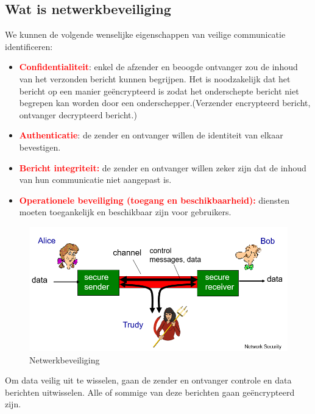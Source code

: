 \subsection{Wat is netwerkbeveiliging}
We kunnen de volgende wenselijke eigenschappen van veilige communicatie identificeren:
\begin{itemize}
    \item \textcolor{red}{\textbf{Confidentialiteit}}: enkel de afzender en beoogde ontvanger zou de inhoud van het verzonden bericht kunnen begrijpen. Het is noodzakelijk dat het bericht op een manier geëncrypteerd is zodat het onderschepte bericht niet begrepen kan worden door een onderschepper.(Verzender encrypteerd bericht, ontvanger decrypteerd bericht.)
    \item \textcolor{red}{\textbf{Authenticatie}}: de zender en ontvanger willen de identiteit van elkaar bevestigen.
    \item \textcolor{red}{\textbf{Bericht integriteit:}} de zender en ontvanger willen zeker zijn dat de inhoud van hun communicatie niet aangepast is.
    \item \textcolor{red}{\textbf{Operationele beveiliging (toegang en beschikbaarheid):}} diensten moeten toegankelijk en beschikbaar zijn voor gebruikers.
\end{itemize}

\begin{figure}[h]
    \centering
    \includegraphics[width=7in]{./img/imghfdst8/hfdst8puntje1.png}
    \caption{Netwerkbeveiliging }      
    \label{fig:Netwerkbeveiliging }
\end{figure}
\noindent Om data veilig uit te wisselen, gaan de zender en ontvanger controle en data berichten uitwisselen. Alle of sommige van deze berichten gaan geëncrypteerd zijn. 

